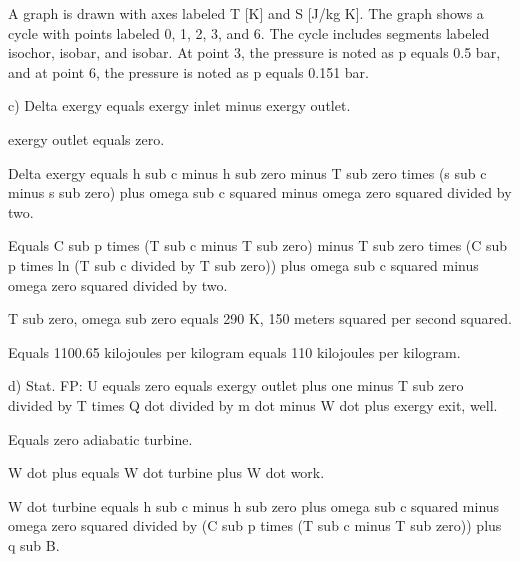A graph is drawn with axes labeled T [K] and S [J/kg K]. The graph shows a cycle with points labeled 0, 1, 2, 3, and 6. The cycle includes segments labeled isochor, isobar, and isobar. At point 3, the pressure is noted as p equals 0.5 bar, and at point 6, the pressure is noted as p equals 0.151 bar.

c) Delta exergy equals exergy inlet minus exergy outlet.

exergy outlet equals zero.

Delta exergy equals h sub c minus h sub zero minus T sub zero times (s sub c minus s sub zero) plus omega sub c squared minus omega zero squared divided by two.

Equals C sub p times (T sub c minus T sub zero) minus T sub zero times (C sub p times ln (T sub c divided by T sub zero)) plus omega sub c squared minus omega zero squared divided by two.

T sub zero, omega sub zero equals 290 K, 150 meters squared per second squared.

Equals 1100.65 kilojoules per kilogram equals 110 kilojoules per kilogram.

d) Stat. FP: U equals zero equals exergy outlet plus one minus T sub zero divided by T times Q dot divided by m dot minus W dot plus exergy exit, well.

Equals zero adiabatic turbine.

W dot plus equals W dot turbine plus W dot work.

W dot turbine equals h sub c minus h sub zero plus omega sub c squared minus omega zero squared divided by (C sub p times (T sub c minus T sub zero)) plus q sub B.